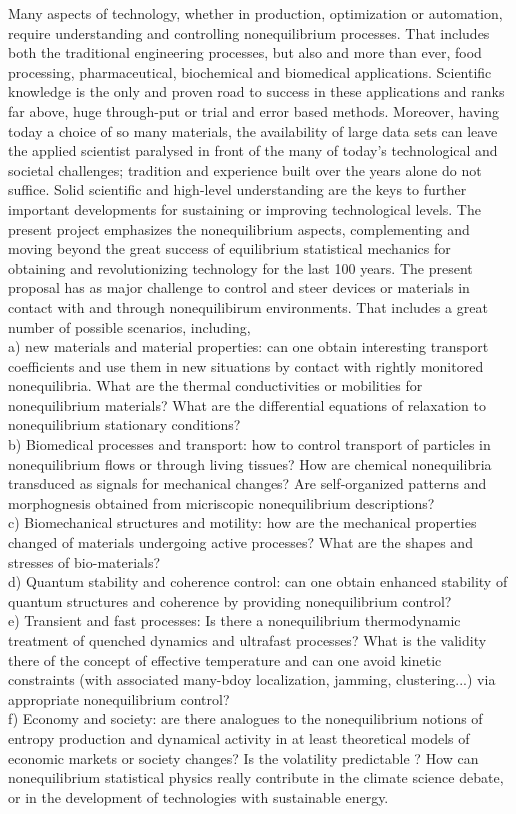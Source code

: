 Many aspects of technology, whether in production, optimization or automation, require understanding and controlling nonequilibrium processes.  That includes both the traditional engineering processes, but also and more than ever, food processing, pharmaceutical, biochemical and biomedical applications.  Scientific knowledge is the only and proven road to success in these applications and ranks far above, huge through-put or trial and error based methods.  Moreover, having today a choice of so many materials, the availability of large data sets can leave the applied scientist paralysed in front of the many of today's technological and societal challenges; tradition and experience built over the years alone do not suffice.  Solid scientific and high-level understanding are the keys to further important developments for sustaining or improving technological levels.  The present project emphasizes the nonequilibrium aspects, complementing and moving beyond the great success of equilibrium statistical mechanics for obtaining and revolutionizing technology for the last 100 years.
The present proposal has as major challenge to control and steer devices or materials in contact with and through nonequilibirum environments.  That includes a great number of possible scenarios, including,\\
a) new materials and material properties:  can one obtain interesting transport coefficients and use them in new situations by contact with rightly monitored nonequilibria.  What are the thermal conductivities or mobilities for nonequilibrium materials?  What are the differential equations of relaxation to nonequilibrium stationary conditions?\\
b) Biomedical processes and transport: how to control transport of particles in nonequilibrium flows or through living tissues?  How are chemical nonequilibria transduced as signals for mechanical changes? Are self-organized patterns and morphognesis obtained from micriscopic nonequilibrium descriptions?\\
c) Biomechanical structures and motility: how are the mechanical properties changed of materials undergoing active processes?  What are the shapes and stresses of bio-materials?\\
d) Quantum stability and coherence control: can one obtain enhanced stability of quantum structures and coherence by providing nonequilibrium control?\\
e) Transient and fast processes: Is there a nonequilibrium thermodynamic treatment of quenched dynamics and ultrafast processes?  What is the validity there of the concept of effective temperature and can one avoid kinetic constraints (with associated many-bdoy localization, jamming, clustering...) via appropriate nonequilibrium control?\\
f) Economy and society: are there analogues to the nonequilibrium notions of entropy production and dynamical activity in at least theoretical models of economic markets or society changes?  Is the volatility predictable ?  How can nonequilibrium statistical physics really contribute in the climate science debate, or in the development of technologies with  sustainable energy.\\

